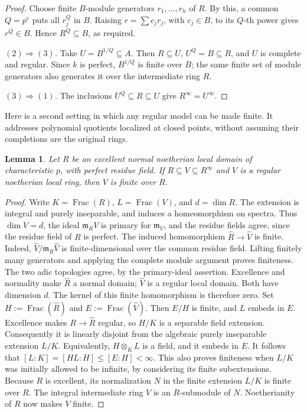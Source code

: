\documentclass[11pt,a4paper]{amsart}
\numberwithin{equation}{section}
\newtheorem{lemma}[theorem]{Lemma}
\newcommand{\Frac}{\operatorname{Frac}}
\begin{document}
\begin{proof}
Choose finite $B$-module generators $r_1,\ldots,r_h$ of $R$.	By this, a common $Q=p^e$ puts all $r_j^Q$ in $B$.	Raising $r=\sum c_jr_j$, with $c_j\in B$, to its $Q$-th power	gives $r^Q\in B$. Hence $R^Q\subseteq B$, as required.

 \emph{$(2)\Rightarrow(3)$.}	Take $U=B^{1/Q}\subseteq A$.	Then $R\subseteq U$, $U^Q=B\subseteq R$, and $U$ is complete
and regular. Since $k$ is perfect, $B^{1/Q}$ is finite over $B$;	the same finite set of module generators also generates it over	the intermediate ring $R$.
 	
 	\emph{$(3)\Rightarrow(1)$.}	The inclusions $U^Q\subseteq R\subseteq U$ give	$R^\infty=U^\infty$.
 \end{proof}
 

 

 
 Here is a second setting in which any regular model can be made
 finite. It addresses polynomial quotients localized at closed
 points, without assuming their completions are the original rings.
 
 \begin{lemma}\label{lem:intermediate-finite}
 	Let $R$ be an excellent normal noetherian local domain of
 	characteristic $p$, with perfect residue field.
 	If
$R\subseteq V\subseteq R^\infty$
 	and $V$ is a regular noetherian local ring, then $V$ is finite
 	over $R$.
 \end{lemma}
 
 \begin{proof}	Write $K=\Frac(R)$, $L=\Frac(V)$, and $d=\dim R$.	The extension is integral and purely inseparable, and induces a	homeomorphism on spectra. Thus $\dim V=d$, the ideal	$\mathfrak m_RV$ is primary for $\mathfrak m_V$, and the residue	fields agree, since the residue field of $R$ is perfect.		The induced homomorphism $	\widehat R\longrightarrow\widehat V$	is finite. Indeed, $\widehat V/\mathfrak m_R\widehat V$ is	finite-dimensional over the common residue field. Lifting finitely	many generators and applying the complete module argument proves	finiteness. The two adic topologies agree, by the primary-ideal 	assertion. 	Excellence and normality make $\widehat R$ a normal domain; 	$\widehat V$ is a regular local domain.
 	Both have dimension $d$. The kernel of this finite homomorphism
 	is therefore zero. Set
 $H:=\Frac(\widehat R)$ and $ E:=\Frac(\widehat V).$	Then $E/H$ is finite, and $L$ embeds in $E$.	Excellence makes $R\to\widehat R$ regular, so $H/K$ is a	separable field extension. Consequently it is linearly disjoint	from the algebraic purely inseparable extension $L/K$.	Equivalently, $H\otimes_K L$ is a field, and it embeds in $E$.	It follows that	$[L:K]=[HL:H]\leq[E:H]<\infty.$	This also proves finiteness when $L/K$ was initially allowed	to be infinite, by considering its finite subextensions. 	Because $R$ is excellent, its normalization $N$ in the finite 	extension $L/K$ is finite over $R$. 	The integral intermediate ring $V$ is an $R$-submodule of $N$.	Noetherianity of $R$ now makes $V$ finite.
 \end{proof}
 
\end{document}
